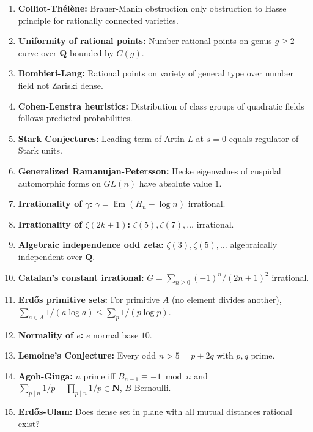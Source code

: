 \documentclass[aps,prd,amsmath,amssymb,twocolumn,superscriptaddress]{revtex4-2}
\begin{document}
\begin{enumerate}[label={\bf \arabic*.}, leftmargin=*, itemsep=2pt]
\item \textbf{Colliot-Th\'el\`ene:} Brauer-Manin obstruction only obstruction to Hasse principle for rationally connected varieties.

\item \textbf{Uniformity of rational points:} Number rational points on genus $g\ge2$ curve over $\mathbf Q$ bounded by $C(g)$.

\item \textbf{Bombieri-Lang:} Rational points on variety of general type over number field not Zariski dense.

\item \textbf{Cohen-Lenstra heuristics:} Distribution of class groups of quadratic fields follows predicted probabilities.

\item \textbf{Stark Conjectures:} Leading term of Artin $L$ at $s=0$ equals regulator of Stark units.

\item \textbf{Generalized Ramanujan-Petersson:} Hecke eigenvalues of cuspidal automorphic forms on $GL(n)$ have absolute value $1$.

\item \textbf{Irrationality of $\gamma$:} $\gamma=\lim(H_n-\log n)$ irrational.

\item \textbf{Irrationality of $\zeta(2k+1)$:} $\zeta(5),\zeta(7),\dots$ irrational.

\item \textbf{Algebraic independence odd zeta:} $\zeta(3),\zeta(5),\dots$ algebraically independent over $\mathbf Q$.

\item \textbf{Catalan's constant irrational:} $G=\sum_{n\ge0}(-1)^n/(2n+1)^2$ irrational.

\item \textbf{Erd\H{o}s primitive sets:} For primitive $A$ (no element divides another), $\sum_{a\in A}1/(a\log a)\le\sum_{p}1/(p\log p)$.

\item \textbf{Normality of $e$:} $e$ normal base $10$.

\item \textbf{Lemoine's Conjecture:} Every odd $n>5 = p+2q$ with $p,q$ prime.

\item \textbf{Agoh-Giuga:} $n$ prime iff $B_{n-1}\equiv-1\bmod n$ and $\sum_{p\mid n}1/p-\prod_{p\mid n}1/p\in\mathbf N$, $B$ Bernoulli.

\item \textbf{Erd\H{o}s-Ulam:} Does dense set in plane with all mutual distances rational exist?

\end{enumerate}
\end{document}
